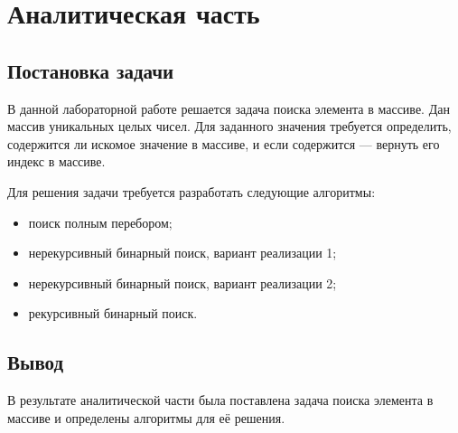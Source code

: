\chapter{Аналитическая часть}
\section{Постановка задачи}
В данной лабораторной работе решается задача поиска элемента в массиве. Дан массив уникальных целых чисел. Для заданного значения требуется определить, содержится ли искомое значение в массиве, и если содержится --- вернуть его индекс в массиве.

Для решения задачи требуется разработать следующие алгоритмы:
\begin{itemize}
	\item поиск полным перебором;
	\item нерекурсивный бинарный поиск, вариант реализации 1;
	\item нерекурсивный бинарный поиск, вариант реализации 2;
	\item рекурсивный бинарный поиск.
\end{itemize}

\section{Вывод}
В результате аналитической части была поставлена задача поиска элемента в массиве и определены алгоритмы для её решения.